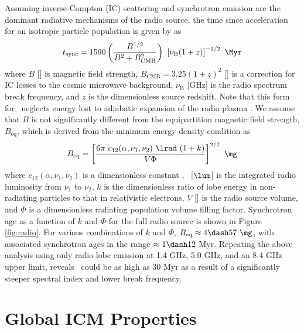 \documentclass[useAMS,usenatbib]{mn2e}
\begin{document}
Assuming inverse-Compton (IC) scattering and synchrotron emission are
the dominant radiative mechanisms of the radio source, the time since
acceleration for an isotropic particle population is given by
\citet{2001AJ....122.1172S} as
\begin{equation}
  \tsync = 1590 \left(\frac{B^{1/2}}{B^2 + B_{\mathrm{CMB}}^2}\right)~
  \left[\nu_{\mathrm{B}} (1+z)\right]^{-1/2} ~\Myr
\end{equation}
where $B$ [\mg] is magnetic field strength, $B_{\mathrm{CMB}} =
3.25(1+z)^2$ [\mg] is a correction for IC losses to the cosmic
microwave background, $\nu_{\mathrm{B}}$ [GHz] is the radio spectrum
break frequency, and $z$ is the dimensionless source redshift. Note
that this form for \tsync\ neglects energy lost to adiabatic expansion
of the radio plasma \citep{1968ARA&A...6..321S}. We assume that $B$ is
not significantly different from the equipartition magnetic field
strength, $B_{\mathrm{eq}}$, which is derived from the minimum energy
density condition as \citep{1980ARA&A..18..165M}
\begin{equation}
  B_{\mathrm{eq}} = \left[\frac{6 \pi ~c_{12}(\alpha,\nu_1, \nu_2)
      ~\lrad ~(1+k)}{V \Phi}\right]^{2/7} ~\mathrm{\mg}
\end{equation}
where $c_{12}(\alpha,\nu_1,\nu_2)$ is a dimensionless constant
\citep{pach}, \lrad\ [$\lum$] is the integrated radio luminosity from
$\nu_1$ to $\nu_2$, $k$ is the dimensionless ratio of lobe energy in
non-radiating particles to that in relativistic electrons, $V$ [\cc]
is the radio source volume, and $\Phi$ is a dimensionless radiating
population volume filling factor. Synchrotron age as a function of $k$
and $\Phi$ for the full radio source is shown in Figure
\ref{fig:radio}. For various combinations of $k$ and $\Phi$,
$B_{\mathrm{eq}} \approx 4 \dash 57 ~\mg$, with associated synchrotron
ages in the range $\approx 1 \dash 12$ Myr. Repeating the above
analysis using only radio lobe emission at 1.4 GHz, 5.0 GHz, and an
8.4 GHz upper limit, reveals \tsync\ could be as high as $30$ Myr as a
result of a significantly steeper spectral index and lower break
frequency.

\section{Global ICM Properties}
\label{sec:global}
\end{document}
